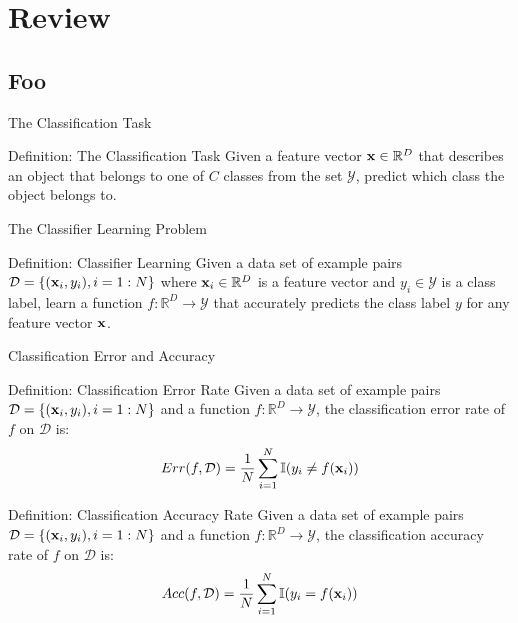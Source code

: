 \documentclass[serif,xcolor=pdftex,dvipsnames,table,hyperref={bookmarks=false}]{beamer}
\begin{document}
\maketitlepage

\section{Review}
\subsection{Foo}


\begin{frame}[t]{The Classification Task}

\begin{block}{Definition: The Classification Task}
Given a feature vector ${\mathbf{x}}\in\mathbb{R}^D$ that describes an object that belongs to one of $C$ classes from the set $\mathcal{Y}$, predict which class the object belongs to.
\end{block}

\end{frame}


\begin{frame}[t]{The Classifier Learning Problem}
\begin{block}{Definition: Classifier Learning}
Given a data set of example pairs $\mathcal{D}=\{({\mathbf{x}}_i,y_i),i=1:N\}$ where ${\mathbf{x}}_i\in\mathbb{R}^D$ is a feature vector and $y_i\in \mathcal{Y}$ is a class label, learn a function $f:\mathbb{R}^D\rightarrow \mathcal{Y}$ that accurately predicts the class label $y$ for any feature vector ${\mathbf{x}}$.
\end{block}
\end{frame}

\begin{frame}[t]{Classification Error and Accuracy}

\begin{block}{Definition: Classification Error Rate}
Given a data set of example pairs $\mathcal{D}=\{({\mathbf{x}}_i,y_i),i=1:N\}$ and a function $f:\mathbb{R}^D\rightarrow \mathcal{Y}$, the classification error rate of $f$ on $\mathcal{D}$ is:
$$Err(f,\mathcal{D}) = \frac{1}{N}\sum_{i=1}^N\mathbb{I}(y_i \neq f({\mathbf{x}}_i))$$
\end{block}

\begin{block}{Definition: Classification Accuracy Rate}
Given a data set of example pairs $\mathcal{D}=\{({\mathbf{x}}_i,y_i),i=1:N\}$ and a function $f:\mathbb{R}^D\rightarrow \mathcal{Y}$, the classification accuracy rate of $f$ on $\mathcal{D}$ is:
$$Acc(f,\mathcal{D}) = \frac{1}{N}\sum_{i=1}^N\mathbb{I}(y_i = f({\mathbf{x}}_i))$$
\end{block}


\end{frame}
\end{document}
